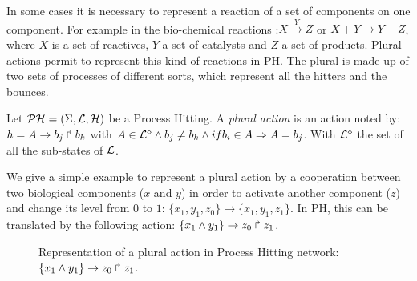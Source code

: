 In some cases it is necessary to represent a reaction of a set of components on one component. For example in the bio-chemical reactions :$X \xrightarrow{Y} Z$ or  $X + Y \rightarrow Y + Z$, where $ X $ is a set of reactives, $ Y $ a set of catalysts and $ Z $ a set of products. %
Plural actions permit to represent this kind of reactions in PH. The plural is made up of two sets of processes of different sorts, which represent all the hitters and the bounces.

\begin{definition}
\label{def:pluralAction}
\label{def:PhPluralAction}
Let $\mathcal{PH} = (\Sigma,\mathcal{L},\mathcal{H})$ be a Process Hitting.
A \emph{plural action} is an action noted by: $h=A\rightarrow b_j\Rsh b_k$ with $A \in \mathcal{L}^{\diamond} \wedge b_j\neq b_k \wedge if b_i \in A \Rightarrow A=b_j$.
With $\mathcal{L}^{\diamond}$ the set of all the sub-states of $\mathcal{L}$.
\end{definition}



\begin{example}
We give a simple example to represent a plural action by a cooperation between two biological components ($x$ and $y$) in order to activate another component ($z$) and change its level from $0$ to $1$: $\{x_1, y_1, z_0 \} \rightarrow \{x_1, y_1, z_1 \} $. In PH, this can be translated by the following action: $\{x_1 \wedge y_1\}\rightarrow z_0\Rsh z_1 $.

\begin{figure}[ht]
\label{fig:ph-plurial} 
\centering
{}
\caption{
Representation of a plural action in Process Hitting network: $\{x_1 \wedge y_1\}\rightarrow z_0\Rsh z_1 $.
}

\end{figure}
\end{example}

